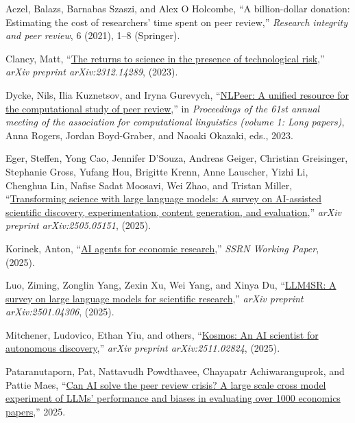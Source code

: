 \documentclass[
  11pt,
  letterpaper,
]{article}
\newlength{\cslhangindent}
\newenvironment{CSLReferences}[2] %
 {\begin{list}{}{%
  \setlength{\itemindent}{0pt}
  \setlength{\leftmargin}{0pt}
  \setlength{\parsep}{0pt}
  \ifodd #1
   \setlength{\leftmargin}{\cslhangindent}
   \setlength{\itemindent}{-1\cslhangindent}
  \fi
  \setlength{\itemsep}{#2\baselineskip}}}
 {\end{list}}
\begin{document}
\label{refs}
\begin{CSLReferences}{1}{0}
Aczel, Balazs, Barnabas Szaszi, and Alex O Holcombe, {``A billion-dollar
donation: Estimating the cost of researchers' time spent on peer
review,''} \emph{Research integrity and peer review}, 6 (2021), 1--8
(Springer).

Clancy, Matt, {``\href{https://arxiv.org/abs/2312.14289}{The returns to
science in the presence of technological risk},''} \emph{arXiv preprint
arXiv:2312.14289}, (2023).

Dycke, Nils, Ilia Kuznetsov, and Iryna Gurevych,
{``\href{https://aclanthology.org/2023.acl-long.277/}{{NLP}eer: A
unified resource for the computational study of peer review},''} in
\emph{Proceedings of the 61st annual meeting of the association for
computational linguistics (volume 1: Long papers)}, Anna Rogers, Jordan
Boyd-Graber, and Naoaki Okazaki, eds., 2023.

Eger, Steffen, Yong Cao, Jennifer D'Souza, Andreas Geiger, Christian
Greisinger, Stephanie Gross, Yufang Hou, Brigitte Krenn, Anne Lauscher,
Yizhi Li, Chenghua Lin, Nafise Sadat Moosavi, Wei Zhao, and Tristan
Miller, {``\href{https://arxiv.org/abs/2502.05151}{Transforming science
with large language models: A survey on AI-assisted scientific
discovery, experimentation, content generation, and evaluation},''}
\emph{arXiv preprint arXiv:2505.05151}, (2025).

Korinek, Anton,
{``\href{https://papers.ssrn.com/sol3/papers.cfm?abstract_id=5455842}{AI
agents for economic research},''} \emph{SSRN Working Paper}, (2025).

Luo, Ziming, Zonglin Yang, Zexin Xu, Wei Yang, and Xinya Du,
{``\href{https://arxiv.org/abs/2501.04306}{LLM4SR: A survey on large
language models for scientific research},''} \emph{arXiv preprint
arXiv:2501.04306}, (2025).

Mitchener, Ludovico, Ethan Yiu, and others,
{``\href{https://arxiv.org/abs/2511.02824}{Kosmos: An AI scientist for
autonomous discovery},''} \emph{arXiv preprint arXiv:2511.02824},
(2025).

Pataranutaporn, Pat, Nattavudh Powdthavee, Chayapatr Achiwaranguprok,
and Pattie Maes,
{``\href{https://api.semanticscholar.org/CorpusID:277510314}{Can AI
solve the peer review crisis? A large scale cross model experiment of
LLMs' performance and biases in evaluating over 1000 economics
papers},''} 2025.


\end{CSLReferences}
\end{document}
